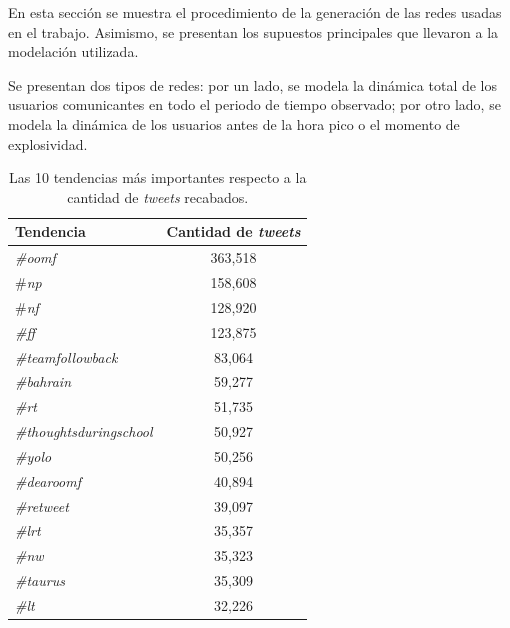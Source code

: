 \documentclass[../main.tex]{subfiles}
\begin{document}
\onehalfspacing

En esta sección se muestra el procedimiento de la generación de  las redes usadas en el trabajo. Asimismo, se presentan los supuestos principales que llevaron a la modelación utilizada.

Se presentan dos tipos de redes: por un lado, se modela la dinámica total de los usuarios comunicantes en todo el periodo de tiempo  observado; por otro lado, se modela  la dinámica de los usuarios antes de la hora pico o el momento de explosividad. 


\begin{table}[h!]
    \caption{Las 10 tendencias más importantes respecto a la cantidad de \textit{tweets} recabados. }
    \centering
    \begin{tabular}{lc}
\toprule
             Tendencia &  Cantidad de \textit{tweets} \\
\midrule
                 \textit{\#oomf} &              363,518 \\
                   \#\textit{np} &              158,608 \\
                   \#\textit{nf} &              128,920 \\
                   \textit{\#ff} &              123,875 \\
       \textit{\#teamfollowback} &               83,064 \\
              \textit{\#bahrain} &               59,277 \\
                   \textit{\#rt} &               51,735 \\
 \textit{\#thoughtsduringschool} &               50,927 \\
                 \textit{\#yolo} &               50,256 \\
             \textit{\#dearoomf} &               40,894 \\
              \textit{\#retweet} &               39,097 \\
                  \textit{\#lrt} &               35,357 \\
                   \textit{\#nw} &               35,323 \\
               \textit{\#taurus} &               35,309 \\
                   \textit{\#lt} &               32,226 \\
\bottomrule
\end{tabular}

    \label{tab:metodologia_10tendenciasmasimportantes}
\end{table}
\end{document}
